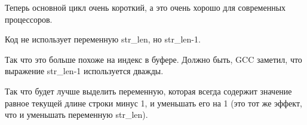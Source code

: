 Теперь основной цикл очень короткий, а это очень хорошо для современных процессоров.

Код не использует переменную str\_len, но str\_len-1.

Так что это больше похоже на индекс в буфере.
Должно быть, GCC заметил, что выражение str\_len-1 используется дважды.

Так что будет лучше выделить переменную, которая всегда содержит значение равное 
текущей длине строки минус 1, и уменьшать его на 1 (это тот же эффект, что и уменьшать
переменную str\_len).

